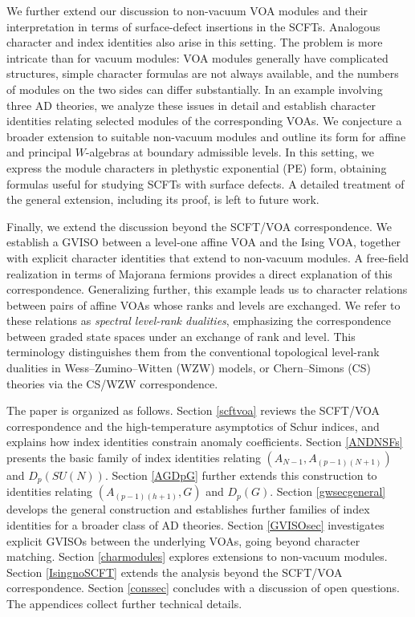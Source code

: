 \documentclass[a4paper,11pt]{article}
\theoremstyle{definition}
\theoremstyle{definition}
\theoremstyle{remark}
\begin{document}
We further extend our discussion to non-vacuum VOA modules and their interpretation in terms of surface-defect insertions in the SCFTs. Analogous character and index identities also arise in this setting. The problem is more intricate than for vacuum modules: VOA modules generally have complicated structures, simple character formulas are not always available, and the numbers of modules on the two sides can differ substantially. In an example involving three AD theories, we analyze these issues in detail and establish character identities relating selected modules of the corresponding VOAs. We conjecture a broader extension to suitable non-vacuum modules and outline its form for affine and principal $W$-algebras at boundary admissible levels. In this setting, we express the module characters in plethystic exponential (PE) form, obtaining formulas useful for studying SCFTs with surface defects. A detailed treatment of the general extension, including its proof, is left to future work.

Finally, we extend the discussion beyond the SCFT/VOA correspondence. We establish a GVISO between a level-one affine VOA and the Ising VOA, together with explicit character identities that extend to non-vacuum modules. A free-field realization in terms of Majorana fermions provides a direct explanation of this correspondence. Generalizing further, this example   leads us to character relations between pairs of affine VOAs whose ranks and levels are exchanged. We refer to these relations as \emph{spectral level-rank dualities}, emphasizing the correspondence between graded state spaces under an exchange of rank and level. This terminology distinguishes them from the conventional topological level-rank dualities in  Wess--Zumino--Witten (WZW)  models, or Chern--Simons (CS)   theories  via the CS/WZW correspondence.

The paper is organized as follows. Section \ref{scftvoa} reviews the SCFT/VOA correspondence and the high-temperature asymptotics of Schur indices, and explains how index identities constrain anomaly coefficients.
 Section \ref{ANDNSFs} presents the basic family of index identities relating ${(A_{N-1},A_{(p-1)(N+1)})}$ and ${D_p(SU(N))}$.
 Section \ref{AGDpG} further extends this construction to identities relating ${(A_{(p-1)(h+1)},G)}$ and ${D_p(G)}$.
 Section \ref{gwsecgeneral} develops the general construction and establishes further families of index identities for a  broader class of AD theories.
 Section \ref{GVISOsec} investigates explicit GVISOs between the underlying VOAs, going beyond character matching.
 Section \ref{charmodules} explores extensions to non-vacuum modules.
 Section \ref{IsingnoSCFT} extends the analysis beyond the SCFT/VOA correspondence.
 Section \ref{conssec} concludes with a discussion of open questions. The appendices collect further technical details.
 
\end{document}
